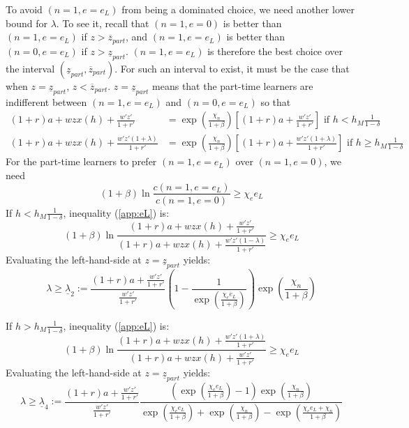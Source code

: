 \documentclass[12pt,english]{article}
\numberwithin{equation}{section}
\begin{document}
{\bigskip
\noindent
To avoid $(n=1,e=e_L)$ from being a dominated choice, we need another lower bound for $\lambda$.
To see it, recall that $(n=1,e=0)$ is better than $(n=1,e=e_L)$ if $z>\overline{z}_{part}$, and $(n=1,e=e_L)$ is better than $(n=0,e=e_L)$ if $z>\underline{z}_{part}$. $(n=1,e=e_L)$ is therefore the best choice over the interval $(\underline{z}_{part},\overline{z}_{part})$. For such an interval to exist, it must be the case that when $z=\underline{z}_{part}$, $z<\overline{z}_{part}$. $z=\underline{z}_{part}$ means that the part-time learners are indifferent between $(n=1,e=e_L)$ and $(n=0,e=e_L)$ so that
\begin{align}
    (1+r)a+wzx(h)+\frac{w'z'}{1+r'}&=\exp(\frac{\chi_n}{1+\beta})\left[(1+r)a+\frac{w'z'}{1+r'}\right] \text{ if } h<h_M\frac{1}{1-\delta} \\
    (1+r)a+wzx(h)+\frac{w'z'(1+\lambda)}{1+r'}&=\exp(\frac{\chi_n}{1+\beta})\left[(1+r)a+\frac{w'z'(1+\lambda)}{1+r'}\right] \text{ if } h \geq h_M\frac{1}{1-\delta} 
\end{align}
For the part-time learners to prefer $(n=1,e=e_L)$ over $(n=1,e=0)$, we need
\begin{equation}\label{app:eL}
    (1+\beta)\ln\frac{c(n=1,e=e_L)}{c(n=1,e=0)} \geq \chi_e e_L
\end{equation}
If $h<h_M\frac{1}{1-\delta}$, inequality (\ref{app:eL}) is:
\begin{equation*}
    (1+\beta)\ln\frac{(1+r)a+wzx(h)+\frac{w'z'}{1+r'}}{(1+r)a+wzx(h)+\frac{w'z'(1-\lambda)}{1+r'}} \geq \chi_e e_L 
\end{equation*}
Evaluating the left-hand-side at $z=\underline{z}_{part}$ yields:
\begin{equation}
    \lambda \geq \underline{\lambda}_2:=\frac{(1+r)a+\frac{w'z'}{1+r'}}{\frac{w'z'}{1+r'}}\left(1-\frac{1}{\exp(\frac{\chi_e e_L}{1+\beta})}\right)\exp(\frac{\chi_n}{1+\beta}) \label{app:lambda2}
\end{equation}

\noindent If $h>h_M\frac{1}{1-\delta}$, inequality (\ref{app:eL}) is:
\begin{equation*}
    (1+\beta)\ln\frac{(1+r)a+wzx(h)+\frac{w'z'(1+\lambda)}{1+r'}}{(1+r)a+wzx(h)+\frac{w'z'}{1+r'}} \geq \chi_e e_L 
\end{equation*}
Evaluating the left-hand-side at $z=\underline{z}_{part}$ yields:
\begin{equation}
    \lambda \geq \underline{\lambda}_4:=\frac{(1+r)a+\frac{w'z'}{1+r'}}{\frac{w'z'}{1+r'}}\frac{\left(\exp(\frac{\chi_e e_L}{1+\beta})-1\right)\exp(\frac{\chi_n}{1+\beta})}{\exp(\frac{\chi_e e_L}{1+\beta})+\exp(\frac{\chi_n}{1+\beta})-\exp(\frac{\chi_e e_L + \chi_n}{1+\beta})} \label{app:lambda4}
\end{equation}

}
\end{document}
